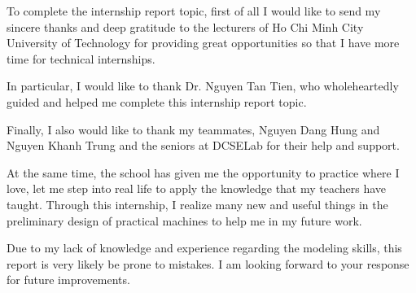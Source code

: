 \documentclass{presets}
\begin{document}
	To complete the internship report topic, first of all I would like to send my sincere thanks and deep gratitude to the lecturers of Ho Chi Minh City University of Technology for providing great opportunities so that I have more time for technical internships.
	
	In particular, I would like to thank Dr. Nguyen Tan Tien, who wholeheartedly guided and helped me complete this internship report topic.
	
	Finally, I also would like to thank my teammates, Nguyen Dang Hung and Nguyen Khanh Trung and the seniors at DCSELab for their help and support.
	
	At the same time, the school has given me the opportunity to practice where I love, let me step into real life to apply the knowledge that my teachers have taught. Through this internship, I realize many new and useful things in the preliminary design of practical machines to help me in my future work.
	
	Due to my lack of knowledge and experience regarding the modeling skills, this report is very likely be prone to mistakes. I am looking forward to your response for future improvements.
	
	
	
%	
%	
%	
%	

	\printbibliography

\end{document}
